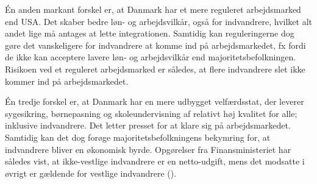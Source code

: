 \documentclass[
]{book}
\begin{document}
Én anden markant forskel er, at Danmark har et mere reguleret arbejdsmarked end USA. Det skaber bedre løn- og arbejdsvilkår, også for indvandrere, hvilket alt andet lige må antages at lette integrationen. Samtidig kan reguleringerne dog gøre det vanskeligere for indvandrere at komme ind på arbejdsmarkedet, fx fordi de ikke kan acceptere lavere løn- og arbejdsvilkår end majoritetsbefolkningen. Risikoen ved et reguleret arbejdsmarked er således, at flere indvandrere slet ikke kommer ind på arbejdsmarkedet.

Én tredje forskel er, at Danmark har en mere udbygget velfærdsstat, der leverer sygesikring, børnepasning og skoleundervisning af relativt høj kvalitet for alle; inklusive indvandrere. Det letter presset for at klare sig på arbejdsmarkedet. Samtidig kan det dog forøge majoritetsbefolkningens bekymring for, at indvandrere bliver en økonomisk byrde. Opgørelser fra Finansministeriet har således vist, at ikke-vestlige indvandrere er en netto-udgift, mens det modsatte i øvrigt er gældende for vestlige indvandrere ().
\end{document}
